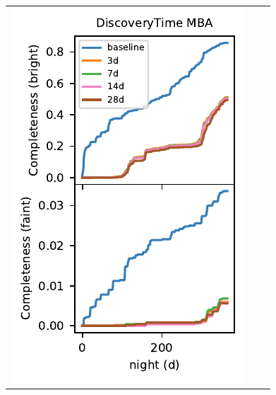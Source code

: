 \documentclass[preprintm,linenumbers]{aastex631}
\begin{document}
		
		\begin{figure}
			\centering
			\begin{tabular}{@{}c@{}c@{}c@{}}
				\includegraphics{results/DiscoveryTime_MBA_first_year_one_snap_v4_0_10yrs_db_n_visits_4_noDD_noTwi.pdf} &

\end{tabular}
\end{figure}
\end{document}

